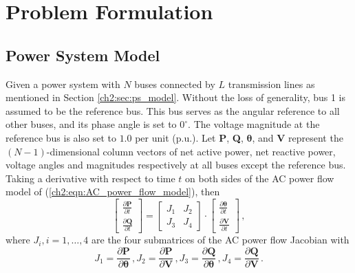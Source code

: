 \section{Problem Formulation}
\label{ch3:sec:formulation}

\subsection{Power System Model}
\label{ch3:sec:power_model}

Given a power system with $N$ buses connected by $L$ transmission lines as mentioned in Section \ref{ch2:sec:ps_model}. Without the loss of generality, bus 1 is assumed to be the reference bus. This bus serves as the angular reference to all other buses, and its phase angle is set to $0^\circ$. The voltage magnitude at the reference bus is also set to $1.0$ per unit (p.u.). Let \textbf{P}, \textbf{Q}, $\boldsymbol{\theta}$, and \textbf{V} represent the $(N-1)$-dimensional column vectors of net active power, net reactive power, voltage angles and magnitudes respectively at all buses except the reference bus. Taking a derivative with respect to time $t$ on both sides of the AC power flow model of (\ref{ch2:eqn:AC_power_flow_model}), then
\begin{equation}
\label{ch3:eqn:ac_jacobian}
\left[\begin{array}{c} \frac{\partial \textbf{P}}{\partial t} \\[.5em] \frac{\partial \textbf{Q}}{\partial t}\end{array}\right]
=
\left[\begin{array}{c|c}
{J}_1 & {J}_2 \\
 \hline {J}_3 & {J}_4 
 \end{array}\right] 
\cdot \left[\begin{array}{c} \frac{\partial \boldsymbol{\theta}}{\partial t} \\[.5em] \frac{\partial \textbf{V}}{\partial t}\end{array}\right] \,,
\end{equation}
where ${J}_i, i = 1, \dots, 4$ are the four submatrices of the AC power flow Jacobian with 
\begin{equation}
{J}_1 = \frac{\partial \textbf{P}}{\partial \boldsymbol{\theta}} \,,  {J}_2 = \frac{\partial \textbf{P}}{\partial \mathbf{V}} \,, {J}_3 = \frac{\partial \textbf{Q}}{\partial \boldsymbol{\theta}} \,, {J}_4 = \frac{\partial \textbf{Q}}{\partial \textbf{V}} \,.
\end{equation}
